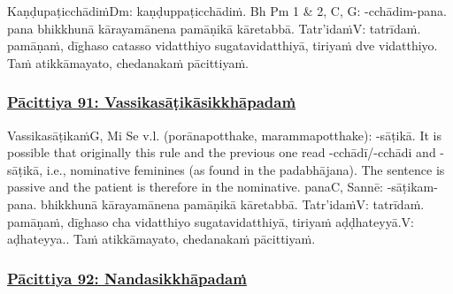 Kaṇḍupaṭicchādiṁ\makeatletter\hyperlink{endnote-appendix}\makeatother Dm: kaṇḍuppaṭicchādiṁ. Bh Pm 1 & 2, C, G: -cchādim-pana.  pana bhikkhunā kārayamānena pamāṇikā kāretabbā. Tatr'idaṁ\makeatletter\hyperlink{endnote-appendix}\makeatother V: tatrīdaṁ. pamāṇaṁ, dīghaso catasso vidatthiyo sugatavidatthiyā, tiriyaṁ dve vidatthiyo. Taṁ atikkāmayato, chedanakaṁ pācittiyaṁ.



\subsubsection*{\hyperref[exp91]{Pācittiya 91: Vassikasāṭikāsikkhāpadaṁ}}
\label{pac91}

Vassikasāṭikaṁ\makeatletter\hyperlink{endnote-appendix}\makeatother G, Mi Se v.l. (porānapotthake, marammapotthake): -sāṭikā. It is possible that originally this rule and the previous one read
-cchādī/-cchādi and -sāṭikā, i.e., nominative feminines (as found in the padabhājana). The sentence is passive and the patient
is therefore in the nominative. pana\makeatletter\hyperlink{endnote-appendix}\makeatother C, Sannē: -sāṭikam-pana.  bhikkhunā kārayamānena pamāṇikā kāretabbā. Tatr'idaṁ\makeatletter\hyperlink{endnote-appendix}\makeatother V: tatrīdaṁ. pamāṇaṁ, dīghaso cha vidatthiyo sugatavidatthiyā, tiriyaṁ aḍḍhateyyā.\makeatletter\hyperlink{endnote-appendix}\makeatother V: aḍhateyya.. Taṁ atikkāmayato, chedanakaṁ pācittiyaṁ.



\subsubsection*{\hyperref[exp92]{Pācittiya 92: Nandasikkhāpadaṁ}}
\label{pac92}

